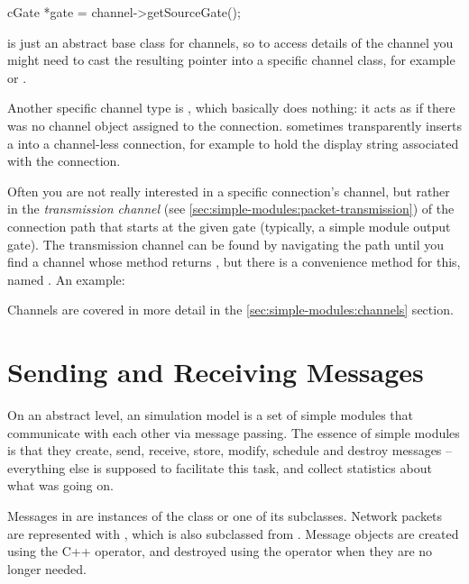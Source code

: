 \begin{cpp}
cGate *gate = channel->getSourceGate();
\end{cpp}

 is just an abstract base class for channels, so
to access details of the channel you might need to cast the resulting
pointer into a specific channel class, for example 
or .

Another specific channel type is , which basically
does nothing: it acts as if there was no channel object assigned to the
connection. {\opp} sometimes transparently inserts a 
into a channel-less connection, for example to hold the display string
associated with the connection.

Often you are not really interested in a specific connection's channel,
but rather in the \textit{transmission channel} (see
\ref{sec:simple-modules:packet-transmission}) of the connection path
that starts at the given gate (typically, a simple module output gate).
The transmission channel can be found by navigating the path until
you find a channel whose  method returns
, but there is a convenience method for this, named
. An example:


Channels are covered in more detail in the \ref{sec:simple-modules:channels}
section.


\section{Sending and Receiving Messages}
\label{sec:simple-modules:sending-and-receiving}

On an abstract level, an {\opp} simulation model is a set of
simple modules that communicate with each other via message passing.
The essence of simple modules is that they create, send, receive,
store, modify, schedule and destroy messages -- everything else
is supposed to facilitate this task, and collect statistics
about what was going on.

Messages in {\opp} are instances of the  class or one of
its subclasses. Network packets are represented with ,
which is also subclassed from . Message objects are
created using the C++  operator, and destroyed using the
 operator when they are no longer needed.

